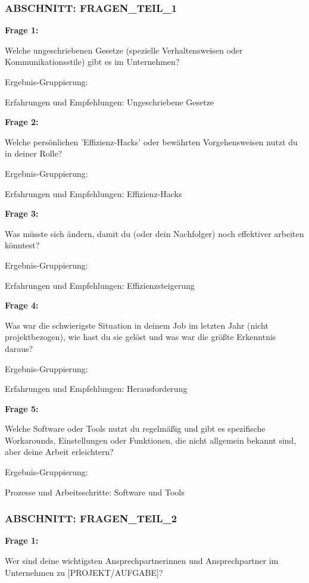 \documentclass[
  10pt,
  ngerman,
  a4paper,
  toc=graduated,
  numbers=noenddot,
  headings=standardclasses,
  nonumberlist
]{scrartcl}
\begin{document}
\subsubsection*{ABSCHNITT: FRAGEN\_TEIL\_1}

\textbf{Frage 1:}

Welche ungeschriebenen Gesetze (spezielle Verhaltensweisen oder Kommunikationsstile) gibt es im Unternehmen?

Ergebnis-Gruppierung:

Erfahrungen und Empfehlungen: Ungeschriebene Gesetze

\textbf{Frage 2:}

Welche persönlichen 'Effizienz-Hacks' oder bewährten Vorgehensweisen nutzt du in deiner Rolle?

Ergebnis-Gruppierung:

Erfahrungen und Empfehlungen: Effizienz-Hacks

\textbf{Frage 3:}

Was müsste sich ändern, damit du (oder dein Nachfolger) noch effektiver arbeiten könntest?

Ergebnis-Gruppierung:

Erfahrungen und Empfehlungen: Effizienzsteigerung

\textbf{Frage 4:}

Was war die schwierigste Situation in deinem Job im letzten Jahr (nicht projektbezogen), wie hast du sie gelöst und was war die größte Erkenntnis daraus?

Ergebnis-Gruppierung:

Erfahrungen und Empfehlungen: Herausforderung

\textbf{Frage 5:}

Welche Software oder Tools nutzt du regelmäßig und gibt es spezifische Workarounds, Einstellungen oder Funktionen, die nicht allgemein bekannt sind, aber deine Arbeit erleichtern?

Ergebnis-Gruppierung:

Prozesse und Arbeitsschritte: Software und Tools

\subsubsection*{ABSCHNITT: FRAGEN\_TEIL\_2}

\textbf{Frage 1:}

Wer sind deine wichtigsten Ansprechpartnerinnen und Ansprechpartner im Unternehmen zu [PROJEKT/\allowbreak AUFGABE]?
\end{document}
